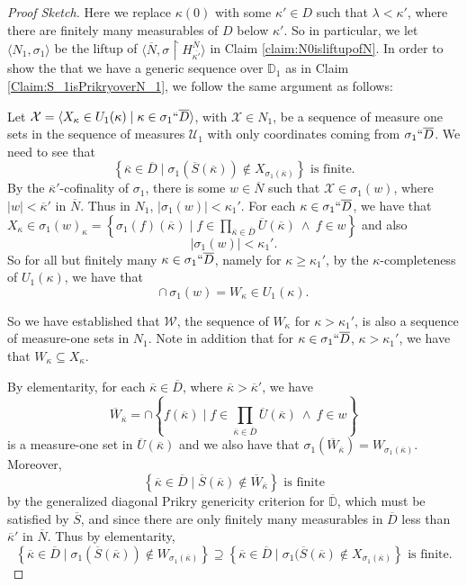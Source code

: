 \documentclass{amsart}
\theoremstyle{definition}
\theoremstyle{remark}
\newcommand{\D}{\mathbb{D}}
\newcommand{\N}{{\overline{N}}}
\renewcommand{\S}{{\overline{S}}}
\newcommand{\U}{\mathcal{U}}
\newcommand{\st}{\; | \;}
\newcommand{\set}[2]{\left\{#1\st #2 \right\}}
\newcommand{\seq}[2]{\langle #1 \st #2 \rangle}
\newcommand{\rest}{\mathbin{\upharpoonright}}
\begin{document}
\begin{proof}[Proof Sketch]
Here we replace $\kappa(0)$ with some $\kappa' \in D$ such that $\lambda < \kappa' $, where there are finitely many measurables of $D$ below $\kappa'$. So in particular, we let $\langle N_1, \sigma_1 \rangle$ be the liftup of $\langle \N, \sigma \rest H_{\overline{\kappa'}}^\N\rangle$ in Claim \ref{claim:N0isliftupofN}. In order to show the that we have a generic sequence over $\D_1$ as in Claim \ref{Claim:S_1isPrikryoverN_1}, we follow the same argument as follows:

Let $\mathcal X = \seq{ X_\kappa \in U_1(\kappa) }{ \kappa \in \sigma_1``\overline D }$, with $\mathcal X \in N_1$, be a sequence of measure one sets in the sequence of measures $\U_1$ with only coordinates coming from $\sigma_1``\overline D$.
We need to see that 
$$\set{ \overline \kappa \in \overline D}{\sigma_1(\S(\overline \kappa)) \notin X_{\sigma_1(\overline \kappa)} }  \text{ is finite.}$$
By the $\overline{\kappa}'$-cofinality of $\sigma_1$, there is some $w \in \N$ such that $\mathcal X \in \sigma_1(w)$, where $|w| < \overline{\kappa}'$ in $\N$. Thus in $N_1$, $|\sigma_1(w)| < \kappa_1'$. For each $\kappa \in \sigma_1``\overline D$, we have that $X_\kappa \in \sigma_1(w)_\kappa = \set{\sigma_1(f)(\overline \kappa) }{ f \in \prod_{\overline \kappa \in \overline D} \overline U(\overline \kappa) \ \land \ f \in w }$ and also $$|\sigma_1(w)|<\kappa_1'.$$ So for all but finitely many $\kappa \in \sigma_1``\overline D$, namely for $\kappa \geq \kappa_1'$, by the $\kappa$-completeness of $U_1(\kappa)$, we have that $$\cap \, \sigma_1(w)=W_\kappa \in U_1(\kappa).$$

So we have established that $\mathcal W$, the sequence of $W_\kappa$ for $\kappa>\kappa_1'$, is also a sequence of measure-one sets in $N_1$. Note in addition that for $\kappa \in \sigma_1``\overline D$, $\kappa> \kappa_1'$, we have that $W_\kappa \subseteq X_\kappa$. 

By elementarity, for each $\overline \kappa \in \overline D$, where $\overline \kappa > \overline \kappa'$, we have $$\overline W_{\overline \kappa} =\cap \set{f(\overline \kappa) }{ f \in \textstyle\prod_{\overline \kappa \in \overline D} \overline U(\overline \kappa) \ \land \ f \in w }$$ is a measure-one set in $\overline U(\overline \kappa)$ and we also have that $\sigma_1(\overline W_{\overline \kappa}) = W_{\sigma_1(\overline \kappa)}$. Moreover, 
	$$\set{\overline \kappa \in \overline D}{\overline S(\overline \kappa) \notin \overline W_{\overline \kappa}} \text{ is finite}$$ by the generalized diagonal Prikry genericity criterion for $\overline{\D}$, which must be satisfied by $\overline S$, and since there are only finitely many measurables in $\overline D$ less than $\overline \kappa'$ in $\N$.
Thus by elementarity,
	$$\set{ \overline \kappa \in \overline D }{ \sigma_1(\overline S(\overline \kappa)) \notin W_{\sigma_1(\overline \kappa)} } \supseteq \set{ \overline \kappa \in \overline D }{ \sigma_1(\overline S(\overline \kappa) \notin X_{\sigma_1(\overline \kappa)}} \text{ is finite.}$$


\end{proof}
\end{document}
